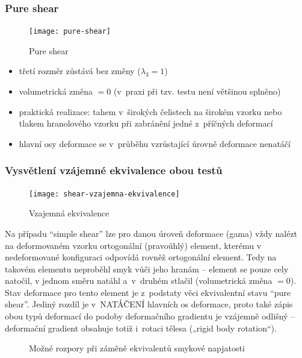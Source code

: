 \subsubsection{Pure shear}
\begin{figure}[H]
	\centering
	\texttt{[image: pure-shear]}
	\caption{Pure shear}
	\label{fig:pure-shear}
\end{figure}

\begin{itemize}
	\item třetí rozměr zůstává bez změny ($\lambda_3 = 1$)
	\item volumetrická změna $= 0$ (v~praxi při tzv.  testu není většinou splněno)
	\item praktická realizace: tahem v~širokých čelistech na širokém vzorku nebo tlakem hranolového vzorku při zabránění jedné z~příčných deformací
\item hlavní osy deformace se v~průběhu vzrůstající úrovně deformace nenatáčí
\end{itemize}

\subsubsection{Vysvětlení vzájemné ekvivalence obou testů}
\begin{figure}[H]
	\centering
	\texttt{[image: shear-vzajemna-ekvivalence]}
	\caption{Vzajemná ekvivalence}
	\label{fig:shear-vzajemna-ekvivalence}
\end{figure}

Na případu \enquote{simple shear} lze pro danou úroveň deformace (gama) vždy nalézt na deformovaném vzorku ortogonální (pravoúhlý) element, kterému v nedeformované konfiguraci odpovídá rovněž ortogonální element. Tedy na takovém elementu neproběhl smyk vůči jeho hranám -- element se pouze cely natočil, v jednom směru natáhl a~v~druhém stlačil (volumetrická změna $= 0$). Stav deformace pro tento element je z~podstaty věci ekvivalentní stavu \enquote{pure shear}. Jediný rozdíl je v~NATÁČENÍ hlavních os deformace,  proto také zápis obou typů deformací do podoby deformačního gradientu je vzájemně odlišný -- deformační gradient obsahuje totiž i~rotaci tělesa („rigid body rotation“).

\begin{figure}[H]
	\centering
	\caption{Možné rozpory při záměně ekvivalentů smykové napjatosti}
\end{figure}

